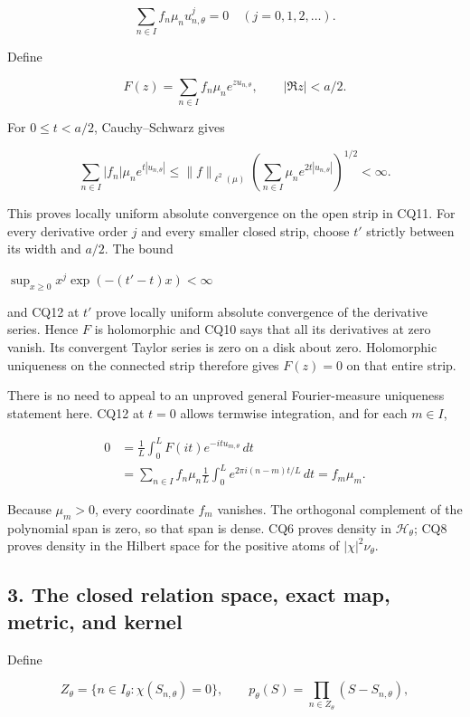 \documentclass{article}
\begin{document}
\[
\sum_{n\in I}f_n\mu_nu_{n,\theta}^{j}=0
\quad(j=0,1,2,\ldots).
\tag{CQ10}
\]

Define

\[
F(z)=\sum_{n\in I}f_n\mu_ne^{zu_{n,\theta}},
\qquad |\Re z|<a/2.
\tag{CQ11}
\]

For \(0 \le t < a/2\), Cauchy--Schwarz gives

\[
\sum_{n\in I}|f_n|\mu_ne^{t|u_{n,\theta}|}
\le\|f\|_{\ell^2(\mu)}
\left(\sum_{n\in I}\mu_ne^{2t|u_{n,\theta}|}\right)^{1/2}<\infty.
\tag{CQ12}
\]

This proves locally uniform absolute convergence on the open strip in CQ11. For every derivative order \(j\) and every smaller closed strip, choose \(t'\) strictly between its width and \(a/2\). The bound

\(\sup_{x \ge 0} x^j \exp(-(t'-t)x) < \infty\)

and CQ12 at \(t'\) prove locally uniform absolute convergence of the derivative series. Hence \(F\) is holomorphic and CQ10 says that all its derivatives at zero vanish. Its convergent Taylor series is zero on a disk about zero. Holomorphic uniqueness on the connected strip therefore gives \(F(z)=0\) on that entire strip.

There is no need to appeal to an unproved general Fourier-measure uniqueness statement here. CQ12 at \(t=0\) allows termwise integration, and for each \(m \in I\),

\[
\begin{aligned}
0&=\frac1L\int_0^L F(it)e^{-it u_{m,\theta}}\,dt\\
&=\sum_{n\in I}f_n\mu_n
\frac1L\int_0^L e^{2\pi i(n-m)t/L}\,dt
=f_m\mu_m.
\end{aligned}
\tag{CQ13}
\]

Because \(\mu_m>0\), every coordinate \(f_m\) vanishes. The orthogonal complement of the polynomial span is zero, so that span is dense. CQ6 proves density in \(\mathcal H_\theta\); CQ8 proves density in the Hilbert space for the positive atoms of \(|\chi|^2 \nu_\theta\).

\subsection{3. The closed relation space, exact map, metric, and kernel}\label{the-closed-relation-space-exact-map-metric-and-kernel}

Define

\[
Z_\theta=\{n\in I_\theta:\chi(S_{n,\theta})=0\},\qquad
p_\theta(S)=\prod_{n\in Z_\theta}(S-S_{n,\theta}),
\tag{CQ14}
\]
\end{document}

